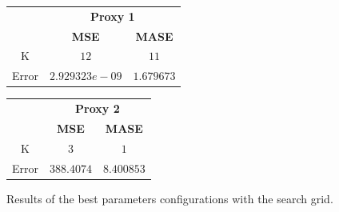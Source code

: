 \begin{figure}[!h]
\centering
\begin{minipage}{\textwidth}
\begin{minipage}{0.5\textwidth}
\begin{center}
\vskip10pt
   \begin{footnotesize}
   \begin{tabular}{|c|c|c|}
   \hline
   & \multicolumn{2}{|c|}{\textbf{Proxy 1}} \\ \cline{2-3}
   & \textbf{MSE} & \textbf{MASE}          \\ \hline
   K  & $12$            & $11$          \\ 
   Error & $2.929323e-09$ & $1.679673$     \\ 
   \hline
   \end{tabular}
   \end{footnotesize}
\end{center}
\end{minipage}
\begin{minipage}{0.5\textwidth}
\begin{center}
\vskip12pt
   \begin{footnotesize}
   \begin{tabular}{|c|c|c|}
   \hline
   & \multicolumn{2}{|c|}{\textbf{Proxy 2}} \\ \cline{2-3}
   & \textbf{MSE} & \textbf{MASE}          \\ \hline
   K  & $3$      & $1$          \\ 
   Error & $388.4074$      & $8.400853$     \\ 
   \hline
   \end{tabular}
   \end{footnotesize}
\end{center}
\end{minipage}
\end{minipage}
\caption{Results of the best parameters configurations with the search grid.}
\label{fig:table10yKnn}
\end{figure}
